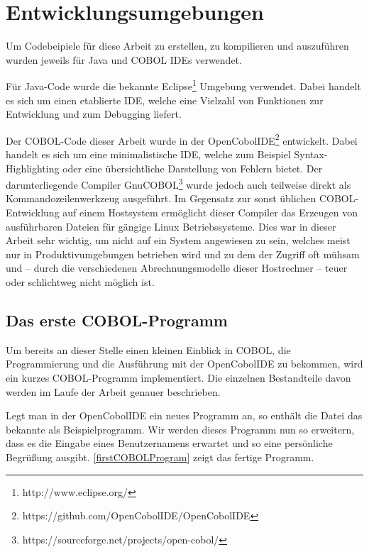 \section{Entwicklungsumgebungen}
Um Codebeipiele für diese Arbeit zu erstellen, zu kompilieren und auszuführen wurden jeweils für Java und COBOL IDEs verwendet.

Für Java-Code wurde die bekannte Eclipse\footnote{http://www.eclipse.org/} Umgebung verwendet. Dabei handelt es sich um einen etablierte IDE, welche eine Vielzahl von Funktionen zur Entwicklung und zum Debugging liefert.

Der COBOL-Code dieser Arbeit wurde in der OpenCobolIDE\footnote{https://github.com/OpenCobolIDE/OpenCobolIDE} entwickelt. Dabei handelt es sich um eine minimalistische IDE, welche zum Beispiel Syntax-Highlighting oder eine übersichtliche Darstellung von Fehlern bietet. Der darunterliegende Compiler GnuCOBOL\footnote{https://sourceforge.net/projects/open-cobol/} wurde jedoch auch teilweise direkt als Kommandozeilenwerkzeug ausgeführt. Im Gegensatz zur sonst üblichen COBOL-Entwicklung auf einem Hostsystem ermöglicht dieser Compiler das Erzeugen von ausführbaren Dateien für gängige Linux Betriebssysteme. Dies war in dieser Arbeit sehr wichtig, um nicht auf ein System angewiesen zu sein, welches meist nur in Produktivumgebungen betrieben wird und zu dem der Zugriff oft mühsam und -- durch die verschiedenen Abrechnungsmodelle dieser Hostrechner -- teuer oder schlichtweg nicht möglich ist.

\subsection*{Das erste COBOL-Programm}

Um bereits an dieser Stelle einen kleinen Einblick in COBOL, die Programmierung und die Ausführung mit der OpenCobolIDE zu bekommen, wird ein kurzes COBOL-Programm implementiert. Die einzelnen Bestandteile davon werden im Laufe der Arbeit genauer beschrieben.

Legt man in der OpenCobolIDE ein neues Programm an, so enthält die Datei das bekannte  als Beispielprogramm. Wir werden dieses Programm nun so erweitern, dass es die Eingabe eines Benutzernamens erwartet und so eine persönliche Begrüßung ausgibt. \autoref{firstCOBOLProgram} zeigt das fertige Programm.


